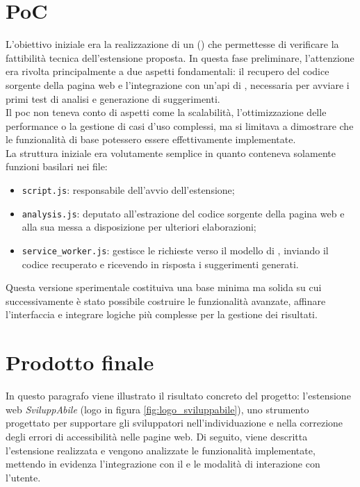 \section{PoC}
\noindent L’obiettivo iniziale era la realizzazione di un  () che permettesse di verificare la fattibilità tecnica dell’estensione proposta. In questa fase preliminare, l’attenzione era rivolta principalmente a due aspetti fondamentali: il recupero del codice sorgente della pagina web e l’integrazione con un’\acrshort{api} di , necessaria per avviare i primi test di analisi e generazione di suggerimenti.\\
Il \acrshort{poc} non teneva conto di aspetti come la scalabilità, l’ottimizzazione delle performance o la gestione di casi d’uso complessi, ma si limitava a dimostrare che le funzionalità di base potessero essere effettivamente implementate. 
\\La struttura iniziale era volutamente semplice in quanto conteneva solamente funzioni basilari nei file:
\begin{itemize}
  \item \texttt{script.js}: responsabile dell’avvio dell’estensione;
  \item \texttt{analysis.js}: deputato all’estrazione del codice sorgente della pagina web e alla sua messa a disposizione per ulteriori elaborazioni;
  \item \texttt{service\_worker.js}: gestisce le richieste verso il modello di , inviando il codice recuperato e ricevendo in risposta i suggerimenti generati.
\end{itemize}

\noindent Questa versione sperimentale costituiva una base minima ma solida su cui successivamente è stato possibile costruire le funzionalità avanzate, affinare l’interfaccia e integrare logiche più complesse per la gestione dei risultati.


\section{Prodotto finale}
\noindent In questo paragrafo viene illustrato il risultato concreto del progetto: l’estensione web \textit{SviluppAbile} (logo in figura \ref{fig:logo_sviluppabile}), uno strumento progettato per supportare gli sviluppatori nell’individuazione e nella correzione degli errori di accessibilità nelle pagine web. Di seguito, viene descritta l’estensione realizzata e vengono analizzate le funzionalità implementate, mettendo in evidenza l’integrazione con il  e le modalità di interazione con l’utente.

